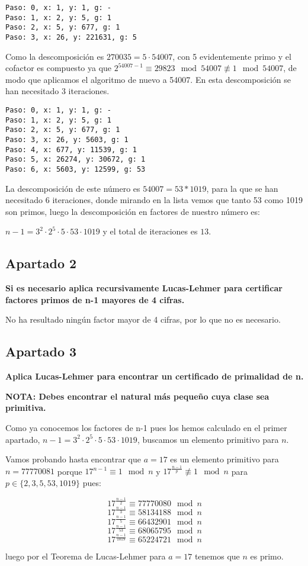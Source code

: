 \documentclass[a4paper]{article}
\begin{document}
\begin{verbatim}
Paso: 0, x: 1, y: 1, g: -
Paso: 1, x: 2, y: 5, g: 1
Paso: 2, x: 5, y: 677, g: 1
Paso: 3, x: 26, y: 221631, g: 5
\end{verbatim}

Como la descomposición es $270035=5\cdot 54007$, con 5 evidentemente primo y el cofactor es compuesto ya que $2^{54007-1}\equiv 29823\mod 54007\not\equiv 1\mod 54007$, de modo que aplicamos el algoritmo de nuevo a 54007.
En esta descomposición se han necesitado 3 iteraciones.

\begin{verbatim}
Paso: 0, x: 1, y: 1, g: -
Paso: 1, x: 2, y: 5, g: 1
Paso: 2, x: 5, y: 677, g: 1
Paso: 3, x: 26, y: 5603, g: 1
Paso: 4, x: 677, y: 11539, g: 1
Paso: 5, x: 26274, y: 30672, g: 1
Paso: 6, x: 5603, y: 12599, g: 53
\end{verbatim}

La descomposición de este número es $54007=53*1019$, para la que se han necesitado 6 iteraciones, donde mirando en la lista vemos que tanto 53 como 1019 son primos, luego la descomposición en factores de nuestro número es:

$n-1=3^2\cdot 2^5\cdot 5 \cdot 53 \cdot 1019$ y el total de iteraciones es $13$.



\subsection{Apartado 2}
\textbf{Si es necesario aplica recursivamente Lucas-Lehmer para certificar factores primos de n-1 mayores de 4 cifras.}

No ha resultado ningún factor mayor de 4 cifras, por lo que no es necesario.

\subsection{Apartado 3}

\textbf{Aplica Lucas-Lehmer para encontrar un certificado de primalidad de n.}

\textbf{NOTA: Debes encontrar el natural más pequeño cuya clase sea primitiva.}

Como ya conocemos los factores de {n-1} pues los hemos calculado en el primer apartado, $n-1=3^2\cdot 2^5\cdot 5 \cdot 53 \cdot 1019$, buscamos un elemento primitivo para $n$.

Vamos probando hasta encontrar que $a=17$ es un elemento primitivo para $n=77770081$ porque $17^{n-1}\equiv 1\mod n$ y $17^{\frac{n-1}{p}}\not\equiv 1\mod n $ para $p\in\{2,3,5,53,1019\}$ pues:

$$17^{\frac{n-1}{2}}\equiv 77770080\mod n$$
$$17^{\frac{n-1}{3}}\equiv 58134188\mod n$$
$$17^{\frac{n-1}{5}}\equiv 66432901\mod n$$
$$17^{\frac{n-1}{53}}\equiv 68065795\mod n$$
$$17^{\frac{n-1}{1019}}\equiv 65224721\mod n$$

luego por el Teorema de Lucas-Lehmer para $a=17$ tenemos que $n$ es primo.
\end{document}
